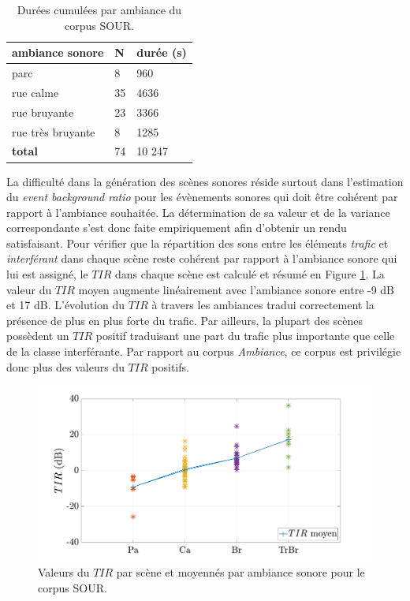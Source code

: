 \begin{table}[h!]
\caption{Durées cumulées par ambiance du corpus SOUR.}
\label{tab:resume_sour}
\centering
\begin{tabular}{L{3cm}C{2cm}C{2cm}}
\textbf{ambiance sonore}  & \textbf{N} & \textbf{durée (s)}  \\ \toprule
parc & 8 & 960 \\
rue calme & 35 & 4636 \\
rue bruyante & 23 & 3366 \\
rue très bruyante & 8 & 1285 \\ \midrule
\textbf{total} & 74 & 10 247 \\ \bottomrule
\end{tabular}
\end{table}

La difficulté dans la génération des scènes sonores réside surtout dans l'estimation du \textit{event background ratio} pour les évènements sonores qui doit être cohérent par rapport à l'ambiance souhaitée. La détermination de sa valeur et de la variance correspondante s'est donc faite empiriquement afin d'obtenir un rendu satisfaisant. Pour vérifier que la répartition des sons entre les éléments \textit{trafic} et \textit{interférant} dans chaque scène reste cohérent par rapport à l'ambiance sonore qui lui est assigné, le $TIR$ dans chaque scène est calculé et résumé en Figure \ref{fig:tir_grafic}. La valeur du $TIR$ moyen augmente linéairement avec l'ambiance sonore entre -9 dB et 17 dB. L'évolution du $TIR$ à travers les ambiances tradui correctement la présence de plus en plus forte du trafic. Par ailleurs, la plupart des scènes possèdent un $TIR$ positif traduisant une part du trafic plus importante que celle de la classe interférante. Par rapport au corpus \textit{Ambiance}, ce corpus est privilégie donc plus des valeurs du $TIR$ positifs. 

\begin{figure}[h]
\centering
\includegraphics[width=.8\linewidth]{./figures/grafic/TIR_grafic.pdf}
\caption{Valeurs du $TIR$ par scène et moyennés par ambiance sonore pour le corpus SOUR.}
\label{fig:tir_grafic}
\end{figure}


